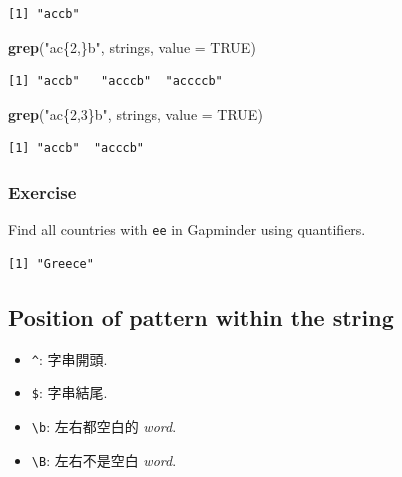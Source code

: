\documentclass[]{book}
\newenvironment{Shaded}{\begin{snugshade}}{\end{snugshade}}
\newcommand{\DataTypeTok}[1]{\textcolor[rgb]{0.13,0.29,0.53}{#1}}
\newcommand{\KeywordTok}[1]{\textcolor[rgb]{0.13,0.29,0.53}{\textbf{#1}}}
\newcommand{\NormalTok}[1]{#1}
\newcommand{\OtherTok}[1]{\textcolor[rgb]{0.56,0.35,0.01}{#1}}
\newcommand{\StringTok}[1]{\textcolor[rgb]{0.31,0.60,0.02}{#1}}
\providecommand{\tightlist}{%
  \setlength{\itemsep}{0pt}\setlength{\parskip}{0pt}}
\theoremstyle{definition}
\theoremstyle{definition}
\theoremstyle{definition}
\theoremstyle{remark}
\begin{document}
\begin{verbatim}
[1] "accb"
\end{verbatim}

\begin{Shaded}
\begin{Highlighting}[]
\KeywordTok{grep}\NormalTok{(}\StringTok{"ac\{2,\}b"}\NormalTok{, strings, }\DataTypeTok{value =} \OtherTok{TRUE}\NormalTok{)}
\end{Highlighting}
\end{Shaded}

\begin{verbatim}
[1] "accb"   "acccb"  "accccb"
\end{verbatim}

\begin{Shaded}
\begin{Highlighting}[]
\KeywordTok{grep}\NormalTok{(}\StringTok{"ac\{2,3\}b"}\NormalTok{, strings, }\DataTypeTok{value =} \OtherTok{TRUE}\NormalTok{)}
\end{Highlighting}
\end{Shaded}

\begin{verbatim}
[1] "accb"  "acccb"
\end{verbatim}

\hypertarget{exercise}{%
\subsubsection{Exercise}\label{exercise}}

Find all countries with \texttt{ee} in Gapminder using quantifiers.

\begin{verbatim}
[1] "Greece"
\end{verbatim}

\hypertarget{position-of-pattern-within-the-string}{%
\subsection{Position of pattern within the
string}\label{position-of-pattern-within-the-string}}

\begin{itemize}
\tightlist
\item
  \texttt{\^{}}: 字串開頭.\\
\item
  \texttt{\$}: 字串結尾.\\
\item
  \texttt{\textbackslash{}b}: 左右都空白的 \emph{word}.\\
\item
  \texttt{\textbackslash{}B}: 左右不是空白 \emph{word}.
\end{itemize}
\end{document}
